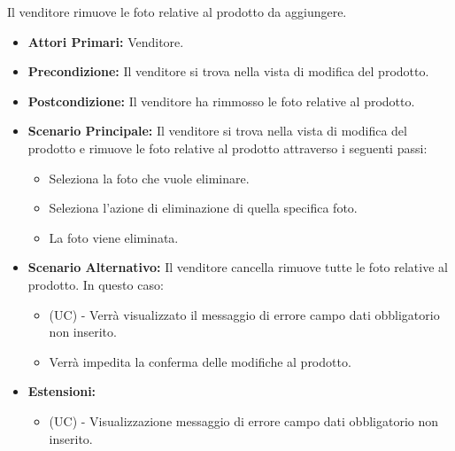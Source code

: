 Il venditore rimuove le foto relative al prodotto da aggiungere.
\begin{itemize}
    \item \textbf{Attori Primari:} Venditore.
    \item \textbf{Precondizione:} Il venditore si trova nella vista di modifica del prodotto.
    \item \textbf{Postcondizione:} Il venditore ha rimmosso le foto relative al prodotto.
    \item \textbf{Scenario Principale:} Il venditore si trova nella vista di modifica del prodotto e rimuove le foto relative al prodotto attraverso i seguenti passi:
    \begin{itemize}
        \item Seleziona la foto che vuole eliminare.
        \item Seleziona l'azione di eliminazione di quella specifica foto.
        \item La foto viene eliminata.
    \end{itemize}
    \item \textbf{Scenario Alternativo:} Il venditore cancella rimuove tutte le foto relative al prodotto. In questo caso:
    \begin{itemize}
        \item (UC) - Verrà visualizzato il messaggio di errore campo dati obbligatorio non inserito.
        \item Verrà impedita la conferma delle modifiche al prodotto.
    \end{itemize}
    \item \textbf{Estensioni:}
    \begin{itemize}
        \item (UC) - Visualizzazione messaggio di errore campo dati obbligatorio non inserito.
    \end{itemize}
\end{itemize}


